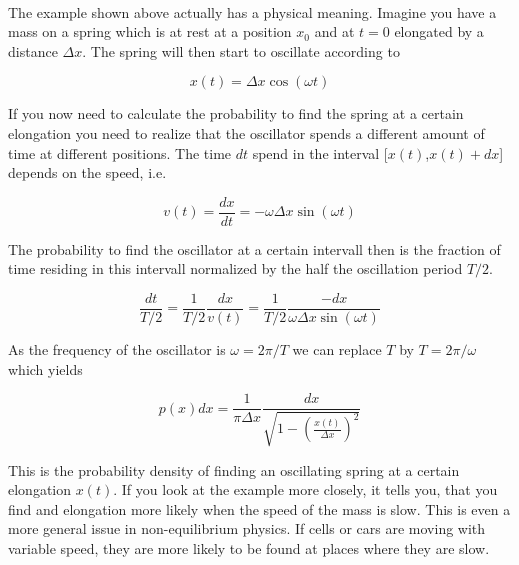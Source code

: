 \documentclass[11pt]{article}
\begin{document}
    \begin{center}
    \end{center}
    { \hspace*{\fill} \\}
    
    The example shown above actually has a physical meaning. Imagine you
have a mass on a spring which is at rest at a position \(x_{0}\) and at
\(t=0\) elongated by a distance \(\Delta x\). The spring will then start
to oscillate according to

\begin{equation}
x(t)=\Delta x \cos(\omega t)
\end{equation}

If you now need to calculate the probability to find the spring at a
certain elongation you need to realize that the oscillator spends a
different amount of time at different positions. The time \(dt\) spend
in the interval {[}\(x(t)\),\(x(t)+dx\){]} depends on the speed, i.e.

\begin{equation}
v(t)=\frac{dx}{dt}=-\omega \Delta x  \sin(\omega t)
\end{equation}

The probability to find the oscillator at a certain intervall then is
the fraction of time residing in this intervall normalized by the half
the oscillation period \(T/2\).

\begin{equation}
\frac{dt}{T/2}=\frac{1}{T/2}\frac{dx}{v(t)}=\frac{1}{T/2}\frac{-dx}{\omega \Delta x  \sin(\omega t)}
\end{equation}

As the frequency of the oscillator is \(\omega=2\pi/T\) we can replace
\(T\) by \(T=2\pi/\omega\) which yields

\begin{equation}
p(x)dx=\frac{1}{\pi \Delta x}\frac{dx}{\sqrt{1-\left (\frac{x(t)}{\Delta x}\right )^2}}
\end{equation}

This is the probability density of finding an oscillating spring at a
certain elongation \(x(t)\). If you look at the example more closely, it
tells you, that you find and elongation more likely when the speed of
the mass is slow. This is even a more general issue in non-equilibrium
physics. If cells or cars are moving with variable speed, they are more
likely to be found at places where they are slow.
\end{document}
